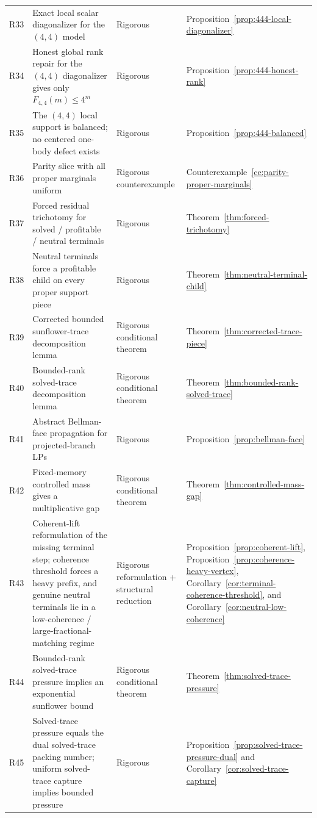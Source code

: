 \documentclass[11pt]{article}
\theoremstyle{definition}
\newcommand{\1}{\mathbf{1}}
\begin{document}
\begin{longtable}{p{}p{}p{}p{}}
R33 & Exact local scalar diagonalizer for the $(4,4)$ model & Rigorous & Proposition~\ref{prop:444-local-diagonalizer}\\
R34 & Honest global rank repair for the $(4,4)$ diagonalizer gives only $F_{4,4}(m)\le 4^m$ & Rigorous & Proposition~\ref{prop:444-honest-rank}\\
R35 & The $(4,4)$ local support is balanced; no centered one-body defect exists & Rigorous & Proposition~\ref{prop:444-balanced}\\
R36 & Parity slice with all proper marginals uniform & Rigorous counterexample & Counterexample~\ref{ce:parity-proper-marginals}\\
R37 & Forced residual trichotomy for solved / profitable / neutral terminals & Rigorous & Theorem~\ref{thm:forced-trichotomy}\\
R38 & Neutral terminals force a profitable child on every proper support piece & Rigorous & Theorem~\ref{thm:neutral-terminal-child}\\
R39 & Corrected bounded sunflower-trace decomposition lemma & Rigorous conditional theorem & Theorem~\ref{thm:corrected-trace-piece}\\
R40 & Bounded-rank solved-trace decomposition lemma & Rigorous conditional theorem & Theorem~\ref{thm:bounded-rank-solved-trace}\\
R41 & Abstract Bellman-face propagation for projected-branch LPs & Rigorous & Proposition~\ref{prop:bellman-face}\\
R42 & Fixed-memory controlled mass gives a multiplicative gap & Rigorous conditional theorem & Theorem~\ref{thm:controlled-mass-gap}\\
R43 & Coherent-lift reformulation of the missing terminal step; coherence threshold forces a heavy prefix, and genuine neutral terminals lie in a low-coherence / large-fractional-matching regime & Rigorous reformulation + structural reduction & Proposition~\ref{prop:coherent-lift}, Proposition~\ref{prop:coherence-heavy-vertex}, Corollary~\ref{cor:terminal-coherence-threshold}, and Corollary~\ref{cor:neutral-low-coherence}\\
R44 & Bounded-rank solved-trace pressure implies an exponential sunflower bound & Rigorous conditional theorem & Theorem~\ref{thm:solved-trace-pressure}\\
R45 & Solved-trace pressure equals the dual solved-trace packing number; uniform solved-trace capture implies bounded pressure & Rigorous & Proposition~\ref{prop:solved-trace-pressure-dual} and Corollary~\ref{cor:solved-trace-capture}\\

\end{longtable}
\end{document}
